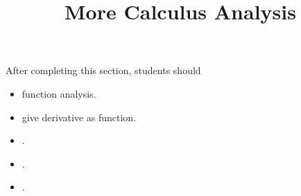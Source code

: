 \documentclass{ximera}
\title{More Calculus Analysis}
\begin{document}
\begin{abstract}
\end{abstract}
\maketitle

\begin{sectionOutcomes}
After completing this section, students should 

\begin{itemize}
\item function analysis.
\item give derivative as function.
\item .
\item .
\item .
\end{itemize}
\end{sectionOutcomes}
\end{document}
